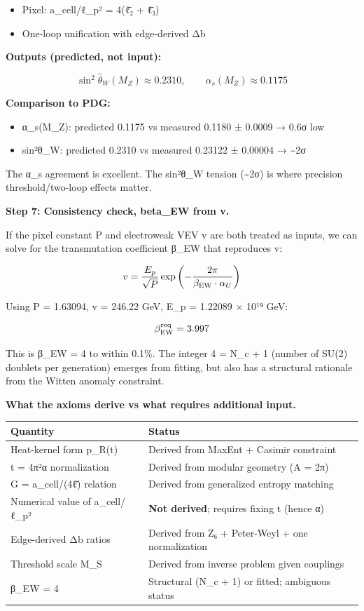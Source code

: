 \begin{itemize}
\tightlist
\item
  Pixel: a\_cell/ℓ\_p² = 4(\={ℓ}₂ + \={ℓ}₃)
\item
  One-loop unification with edge-derived Δb
\end{itemize}

\textbf{Outputs (predicted, not input):}

\[
\sin^2\hat{\theta}_W(M_Z) \approx 0.2310, \qquad \alpha_s(M_Z) \approx 0.1175
\]

\textbf{Comparison to PDG:}

\begin{itemize}
\tightlist
\item
  α\_s(M\_Z): predicted 0.1175 vs measured 0.1180 ± 0.0009 → 0.6σ low
\item
  sin²θ\_W: predicted 0.2310 vs measured 0.23122 ± 0.00004 → \textasciitilde2σ
\end{itemize}

The α\_s agreement is excellent. The sin²θ\_W tension (\textasciitilde2σ) is where precision threshold/two-loop effects matter.

\textbf{Step 7: Consistency check, beta\_EW from v.}

If the pixel constant P and electroweak VEV v are both treated as inputs, we can solve for the transmutation coefficient β\_EW that reproduces v:

\[
v = \frac{E_p}{\sqrt{P}} \exp\left(-\frac{2\pi}{\beta_{\rm EW} \cdot \alpha_U}\right)
\]

Using P = 1.63094, v = 246.22 GeV, E\_p = 1.22089 × 10¹⁹ GeV:

\[
\beta_{\rm EW}^{\rm req} = 3.997
\]

This is β\_EW = 4 to within 0.1\%. The integer 4 = N\_c + 1 (number of SU(2) doublets per generation) emerges from fitting, but also has a structural rationale from the Witten anomaly constraint.

\textbf{What the axioms derive vs what requires additional input.}

{\def\LTcaptype{none} %
\begin{longtable}[]{@{}>{\RaggedRight\arraybackslash}p{}>{\RaggedRight\arraybackslash}p{}@{}}
\toprule\noalign{}
Quantity & Status \\
\midrule\noalign{}
\endhead
\bottomrule\noalign{}
\endlastfoot
Heat-kernel form p\_R(t) & Derived from MaxEnt + Casimir constraint \\
t = 4π²α normalization & Derived from modular geometry (A = 2π) \\
G = a\_cell/(4\={ℓ}) relation & Derived from generalized entropy matching \\
Numerical value of a\_cell/ℓ\_p² & \textbf{Not derived}; requires fixing t (hence α) \\
Edge-derived Δb ratios & Derived from Z₆ + Peter-Weyl + one normalization \\
Threshold scale M\_S & Derived from inverse problem given couplings \\
β\_EW = 4 & Structural (N\_c + 1) or fitted; ambiguous status \\
\end{longtable}
}

